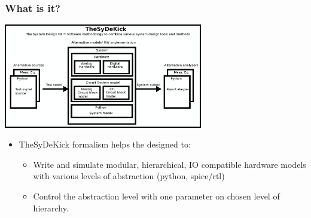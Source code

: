 \documentclass{sdkslides}
\newcommand{\sectname}{Section Name}
\begin{document}
\renewcommand{\sectname}{What is it?}
\begin{frame}[t]
    \frametitle{\sectname}
    \centering
        \includegraphics[width=0.65\textwidth]{Pics/TheSDK_block_diagram.eps}
        \begin{itemize}
            \item TheSyDeKick formalism helps the designed to: 
            \begin{itemize}
                \item Write and simulate modular, hierarchical, IO compatible
                    hardware models with various levels of abstraction (python,
                    spice/rtl)
                \item Control the abstraction level with one parameter on
                    chosen level of hierarchy.
            \end{itemize}
        \end{itemize}
\end{frame}
\end{document}
